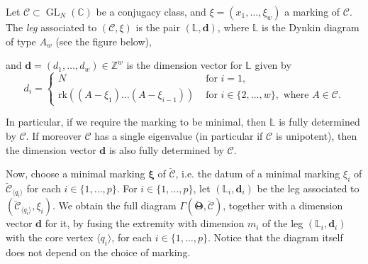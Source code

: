 \documentclass[11pt,a4paper]{amsart}
\numberwithin{equation}{section}
\DeclareMathOperator{\GL}{GL}
\newcommand{\cir}[1]{\langle #1 \rangle}
\begin{document}
\begin{definition}
Let $\mathcal C\subset\GL_N(\mathbb C)$ be a conjugacy class, and $\xi=(x_1, \dots, \xi_w)$ a marking of $\mathcal C$. The \emph{leg} associated to $(\mathcal C, \xi)$ is the pair $(\mathbb L, \mathbf d)$, where $\mathbb L$ is the Dynkin diagram of type $A_w$ (see the figure below),
\vspace{0.3cm}
\begin{center}
%
\end{center}
and $\mathbf d=(d_1, \dots, d_w)\in \mathbb Z^w$ is the dimension vector for $\mathbb L$ given by
\begin{equation}
d_i=\left\lbrace
\begin{array}{ll}
N & \text{ for } i=1,\\
\mathrm{rk}\left((A-\xi_1)\dots(A-\xi_{i-1})\right) & \text{ for } i\in \{2, \dots, w\}, \text{ where } A\in\mathcal C.
\end{array}
\right.
\end{equation}

\end{definition}



In particular, if we require the marking to be minimal, then $\mathbb L$ is fully determined by $\mathcal C$. If moreover $\mathcal C$ has a single eigenvalue (in particular if $\mathcal C$ is unipotent), then the dimension vector $\mathbf d$ is also fully determined by $\mathcal C$. 

Now, choose a minimal marking $\bm\xi$ of $\breve{\bm{\mathcal C}}$, i.e. the datum of a minimal marking $\xi_i$ of $\breve{\mathcal C}_{\cir{q_i}}$ for each $i\in \{1, \dots, p\}$.
For $i\in \{1, \dots, p\}$, let $(\mathbb L_i, \mathbf d_i)$ be the leg associated to $(\breve{\mathcal C}_{\cir{q_i}}, \xi_i)$.
We obtain the full diagram $\Gamma(\bm{\breve\Theta}, \bm{\breve{\mathcal C}})$, together with a dimension vector $\mathbf d$ for it, by fusing the extremity with dimension $m_i$ of the leg $(\mathbb L_i, \mathbf d_i)$ with the core vertex $\cir{q_i}$, for each $i\in \{1, \dots, p\}$. Notice that the diagram itself does not depend on the choice of marking. \\
\end{document}
